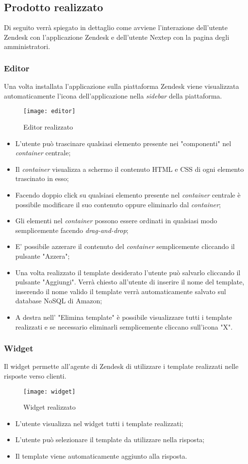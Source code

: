 \subsection{Prodotto realizzato}
\label{cap:progetto-terminato}
Di seguito verrà spiegato in dettaglio come avviene l’interazione dell'utente Zendesk con l'applicazione
Zendesk e dell'utente Nextep con la pagina degli amministratori.

\subsubsection{Editor}
Una volta installata l'applicazione sulla piattaforma Zendesk viene visualizzata automaticamente l'icona dell'applicazione nella \emph{sidebar} della piattaforma. 
\begin{figure}[!h] 
	\centering 
	\texttt{[image: editor]} 
	\caption{Editor realizzato }
\end{figure}
\begin{itemize}
	\item L'utente può trascinare qualsiasi elemento presente nei "componenti" nel \emph{container} centrale;
	\item Il \emph{container} visualizza a schermo il contenuto  HTML e CSS di ogni elemento trascinato in esso;
	\item Facendo doppio click su qualsiasi elemento presente nel \emph{container} centrale è possibile modificare il suo contenuto oppure eliminarlo dal \emph{container};
	\item Gli elementi nel \emph{container} possono essere ordinati in qualsiasi modo semplicemente facendo \emph{drag-and-drop};
	\item E' possibile azzerare il contenuto del \emph{container} semplicemente cliccando il pulsante "Azzera";
	\item Una volta realizzato il template desiderato l'utente può salvarlo cliccando il pulsante "Aggiungi". Verrà chiesto all'utente di inserire il nome del template, inserendo il nome valido il template verrà automaticamente salvato sul database NoSQL di Amazon;
	\item A destra nell' "Elimina template" è possibile visualizzare tutti i template realizzati e se necessario eliminarli semplicemente cliccano sull'icona "X".  
\end{itemize}
\subsubsection{Widget} 
Il widget permette all'agente di Zendesk di utilizzare i template realizzati nelle risposte verso clienti. 
\begin{figure}[!h] 
	\centering 
	\texttt{[image: widget]} 
	\caption{Widget realizzato }
\end{figure}
\begin{itemize}
	\item L'utente visualizza nel widget tutti i template realizzati;
	\item L'utente può selezionare il template da utilizzare nella risposta;
	\item Il template viene automaticamente aggiunto alla risposta. 
\end{itemize}
\newpage
